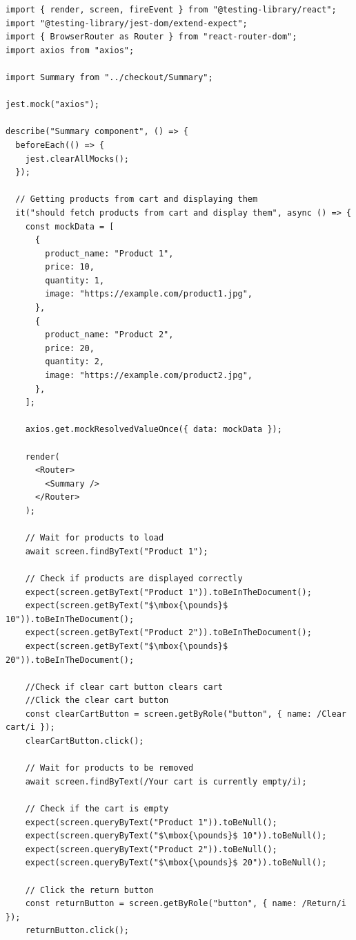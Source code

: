 \documentclass[article]{IEEEtran}
\begin{document}
            \begin{lstlisting}[style=jsListingStyle, caption={Cart functionality tests}, captionpos=t, mathescape=true]
import { render, screen, fireEvent } from "@testing-library/react";
import "@testing-library/jest-dom/extend-expect";
import { BrowserRouter as Router } from "react-router-dom";
import axios from "axios";

import Summary from "../checkout/Summary";

jest.mock("axios");

describe("Summary component", () => {
  beforeEach(() => {
    jest.clearAllMocks();
  });

  // Getting products from cart and displaying them
  it("should fetch products from cart and display them", async () => {
    const mockData = [
      {
        product_name: "Product 1",
        price: 10,
        quantity: 1,
        image: "https://example.com/product1.jpg",
      },
      {
        product_name: "Product 2",
        price: 20,
        quantity: 2,
        image: "https://example.com/product2.jpg",
      },
    ];

    axios.get.mockResolvedValueOnce({ data: mockData });

    render(
      <Router>
        <Summary />
      </Router>
    );

    // Wait for products to load
    await screen.findByText("Product 1");

    // Check if products are displayed correctly
    expect(screen.getByText("Product 1")).toBeInTheDocument();
    expect(screen.getByText("$\mbox{\pounds}$ 10")).toBeInTheDocument();
    expect(screen.getByText("Product 2")).toBeInTheDocument();
    expect(screen.getByText("$\mbox{\pounds}$ 20")).toBeInTheDocument();

    //Check if clear cart button clears cart
    //Click the clear cart button
    const clearCartButton = screen.getByRole("button", { name: /Clear cart/i });
    clearCartButton.click();

    // Wait for products to be removed
    await screen.findByText(/Your cart is currently empty/i);

    // Check if the cart is empty
    expect(screen.queryByText("Product 1")).toBeNull();
    expect(screen.queryByText("$\mbox{\pounds}$ 10")).toBeNull();
    expect(screen.queryByText("Product 2")).toBeNull();
    expect(screen.queryByText("$\mbox{\pounds}$ 20")).toBeNull();

    // Click the return button
    const returnButton = screen.getByRole("button", { name: /Return/i });
    returnButton.click();


\end{lstlisting}
\end{document}
